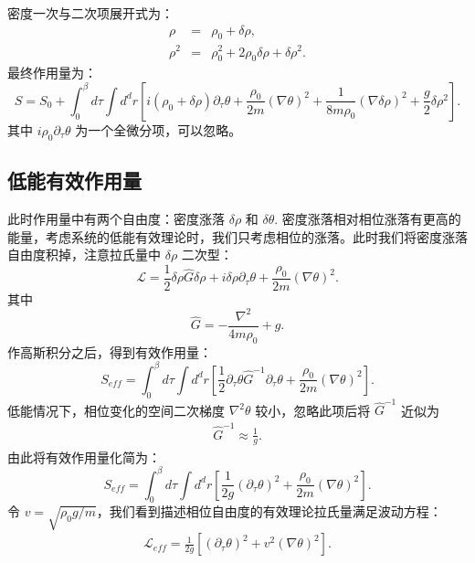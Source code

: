 \documentclass[10pt,UTF8]{ctexart}
\begin{document}
密度一次与二次项展开式为：
\begin{eqnarray}
	\rho &=& \rho_0 + \delta\rho, \\
	\rho^2 &=& \rho_0^2 + 2\rho_0 \delta\rho + \delta\rho^2.
\end{eqnarray}
最终作用量为：
\begin{equation}
	S = S_0 + \int_0^\beta d\tau \int d^d r \left[i(\rho_0+\delta\rho)\partial_\tau\theta + \frac{\rho_0}{2m}(\nabla \theta)^2+\frac{1}{8m\rho_0}(\nabla \delta\rho)^2+\frac{g}{2}\delta\rho^2 \right].
\end{equation}
其中 $i\rho_0 \partial_\tau \theta$ 为一个全微分项，可以忽略。

\subsection*{低能有效作用量}
\noindent
此时作用量中有两个自由度：密度涨落 $\delta\rho$ 和 $\delta\theta$. 密度涨落相对相位涨落有更高的能量，考虑系统的低能有效理论时，我们只考虑相位的涨落。此时我们将密度涨落自由度积掉，注意拉氏量中 $\delta\rho$ 二次型：
\begin{equation}
	\mathcal L =
	\frac{1}{2}\delta\rho \hat G \delta\rho
	+ i\delta\rho \partial_\tau\theta + \frac{\rho_0}{2m}(\nabla\theta)^2.
\end{equation}
其中
\begin{equation}
	\hat G = -\frac{\nabla^2}{4m\rho_0} + g.
\end{equation}
作高斯积分之后，得到有效作用量：
\begin{equation}
	S_{eff}
	= \int_0^\beta d\tau \int d^d r \left[\frac{1}{2}\partial_\tau\theta \hat G^{-1} \partial_\tau \theta + \frac{\rho_0}{2m}(\nabla\theta)^2\right].
\end{equation}
低能情况下，相位变化的空间二次梯度 $\nabla^2\theta$ 较小，忽略此项后将 $\hat G^{-1}$ 近似为
\begin{eqnarray}
	\hat G^{-1} \approx \frac{1}{g}.
\end{eqnarray}
由此将有效作用量化简为：
\begin{equation}
	S_{eff}
	= \int_0^\beta d\tau \int d^d r 
	\left[
		\frac{1}{2g} (\partial_\tau \theta)^2 + \frac{\rho_0}{2m}(\nabla\theta)^2
	\right].
\end{equation}
令 $v = \sqrt{\rho_0 g/m}$，我们看到描述相位自由度的有效理论拉氏量满足波动方程：
\begin{eqnarray}
	\mathcal L_{eff} = \frac{1}{2g} \left[(\partial_\tau \theta)^2+v^2(\nabla \theta)^2 \right].
\end{eqnarray}
\end{document}
